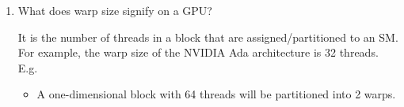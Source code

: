 \documentclass[../main.tex]{subfiles}
\begin{document}
\begin{enumerate}
    \item What does warp size signify on a GPU?
    
    It is the number of threads in a block that are assigned/partitioned to an SM. For example, the warp size
    of the NVIDIA Ada architecture is 32 threads. E.g. 
    
    \begin{itemize}
        \item A one-dimensional block with 64 threads will be partitioned into 2 warps.
    \end{itemize}
\end{enumerate}
\end{document}
